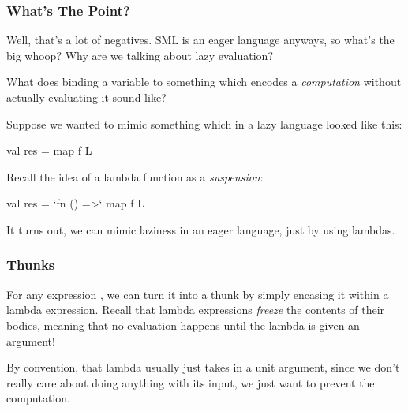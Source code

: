 \documentclass[aspectratio=169]{beamer}
\begin{document}
\begin{frame}[fragile]
  \frametitle{What's The Point?}

  Well, that's a lot of negatives. SML is an eager language anyways, so what's
  the big whoop? Why are we talking about lazy evaluation?

  \pause
  \vspace{\fill}

  What does binding a variable to something which encodes a \textit{computation}
  without actually evaluating it sound like?

  \pause
  \vspace{\fill}

  Suppose we wanted to mimic something which in a lazy language looked like
  this:
  \begin{codeblock}
    val res = map f L
  \end{codeblock}

  \pause
  \vspace{\fill}

  Recall the idea of a lambda function as a \textit{suspension}:
  \begin{codeblock}
    val res = `fn () =>` map f L
  \end{codeblock}

  \pause
  \vspace{\fill}

  It turns out, we can mimic laziness in an eager language, just by using
  lambdas.
\end{frame}

\begin{frame}[fragile]
  \frametitle{Thunks}


  \pause
  \vspace{\fill}

  For any expression , we can turn it into a thunk by simply encasing
  it within a lambda expression. Recall that lambda expressions \textit{freeze}
  the contents of their bodies, meaning that no evaluation happens until the
  lambda is given an argument!

  \pause
  \vspace{\fill}


  \pause
  \vspace{\fill}

  By convention, that lambda usually just takes in a unit argument,
  since we don't really care about doing anything with its input, we just
  want to prevent the computation.
\end{frame}
\end{document}
